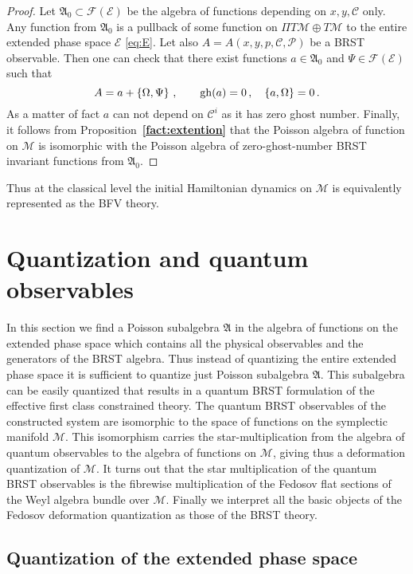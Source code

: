 \documentclass[a4paper,11pt,oneside]{amsart}
\theoremstyle{plain}
\numberwithin{equation}{section} %
\numberwithin{figure}{section} %
\newcommand{\bref}[1]{{\bf \ref{#1}}}
\newcommand{\pb}[2]{\left\{{}#1{},{}#2{}\right\}}
\newcommand{\gh}[1]{{\rm gh}(#1)}
\def\cP{{\mathcal P}}
\def\cc{{\mathcal C}}
\newcommand{\formal}[1]{{{\mathcal F}}{(#1)}}             %
\def\manM{{\mathcal M}}
\def\aA{{ \mathfrak A}}
\def\E{{ \mathcal E}}
\begin{document}
\begin{proof}
Let $\aA_0 \subset \formal{\E}$ be the algebra of functions
depending on $x,y,\cc$ only.  Any function from $\aA_0$ is
a pullback of some function on $\Pi T\manM \oplus T\manM$ to
the entire extended phase space
$\E$ \eqref{eq:E}.  Let also
$A=A(x,y,p,\cc,\cP)$ be a BRST observable. Then one can check
that there exist functions $a\in \aA_0$ and $\Psi \in \formal{\E}$ such that
\begin{equation}
A=a+\pb{\Omega}{\Psi}\,, \qquad  \gh{a}=0\,,\quad \pb{a}{\Omega}=0\,.
\end{equation}
As a matter of fact $a$ can not depend on $\cc^i$
as it has zero ghost number.  Finally, it follows from
Proposition~\bref{fact:extention} that
the Poisson algebra of function on $\manM$
is isomorphic with the Poisson algebra of zero-ghost-number
BRST invariant functions from $\aA_0$.
\end{proof}
Thus at the classical level the initial Hamiltonian
dynamics on $\manM$ is equivalently represented as the
BFV theory.

\section{Quantization and quantum observables}
In this section we find a Poisson subalgebra $\aA$ in the algebra
of functions on the extended phase space which contains
all the physical observables and the generators of the
BRST algebra.  Thus instead of quantizing the entire
extended phase space it is sufficient to quantize
just Poisson subalgebra $\aA$.  This subalgebra can
be easily quantized that results in a quantum BRST
formulation of the effective first class constrained
theory.  The quantum BRST observables of the constructed
system are isomorphic to the space of functions on
the symplectic manifold $\manM$.  This isomorphism
carries the star-multiplication from the algebra of
quantum observables to the algebra of functions
on $\manM$, giving thus a deformation quantization
of $\manM$.  It turns out that the star multiplication
of the quantum BRST observables is the fibrewise
multiplication of the Fedosov flat sections of the
Weyl algebra bundle over $\manM$. Finally we interpret
all the basic objects of the Fedosov deformation quantization
as those of the BRST theory.

\subsection{Quantization of the extended phase space}
\end{document}
